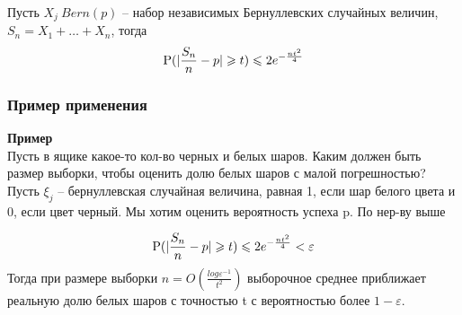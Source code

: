 \begin{theorem*}[следствие]
    Пусть $X_j ~ Bern(p) $ -- набор независимых Бернуллевских случайных величин, $S_n = X_1 + \dots + X_n$, тогда
    \begin{equation*}
        \P(|\frac{S_n}{n} - p| \geq t) \leq 2e^{-\frac{nt^2}{4}}
    \end{equation*}
\end{theorem*}

\subsubsection{Пример применения}
\textbf{Пример}\\
Пусть в ящике какое-то кол-во черных и белых шаров. Каким должен быть размер выборки, чтобы оценить долю белых шаров с малой погрешностью? Пусть $\xi_j $ -- бернуллевская случайная величина, равная 1, если шар белого цвета и 0, если цвет черный. Мы хотим оценить вероятность успеха p. По нер-ву выше

\begin{equation*}
    \P(|\frac{S_n}{n} - p| \geq t) \leq 2e^{-\frac{nt^2}{4}} < \varepsilon
\end{equation*}
Тогда при размере выборки $n = O(\frac{log\varepsilon^{-1}}{t^2})$ выборочное среднее приближает реальную долю белых шаров с точностью t с вероятностью более $1 - \varepsilon$.




